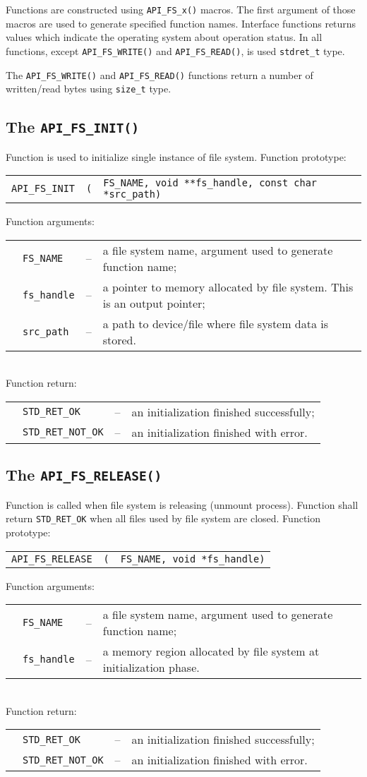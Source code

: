 \documentclass[a4paper,11pt]{report}
\makeatletter
\newcommand{\macro}[1]{\texttt{#1}}
\newcommand{\code}[1]{\texttt{#1}}
\newcommand{\type}[1]{\texttt{#1}}
\newcommand{\prototype}[2]{
   \begin{tabularx}{\textwidth}{@{}l@{}l@{}X}
      \code{#1} & \code{(} & \code{#2)}
   \end{tabularx}
}
\newcommand{\apidescription}[5]{
   #1\newline Function prototype:
   \begin{center}
      \prototype{#2}{#3}
   \end{center}
   Function arguments:\\
   \indent
   \begin{tabularx}{0.95\textwidth}{@{}lllX@{}}
      #4
   \end{tabularx}\\[1ex]
   Function return:\\
   \indent
   \begin{tabularx}{0.95\textwidth}{@{}lllX@{}}
      #5
   \end{tabularx}
}
\newcommand{\apiarg}[2]{\textbullet & \code{#1} & -- & #2\\}
\newcommand{\apiret}[2]{\textbullet & \code{#1} & -- & #2\\}
\makeatother
\begin{document}
Functions are constructed using \macro{API\_FS\_x()} macros. The first argument of those macros are
used to generate specified function names. Interface functions returns values which indicate the
operating system about operation status. In all functions, except \macro{API\_FS\_WRITE()} and
\macro{API\_FS\_READ()}, is used \type{stdret\_t} type.

The \macro{API\_FS\_WRITE()} and \macro{API\_FS\_READ()} functions return a number of written/read
bytes using \type{size\_t} type.

\subsection{The \code{API\_FS\_INIT()}}
\apidescription
{
   Function is used to initialize single instance of file system.
}
{API\_FS\_INIT}{FS\_NAME, void **fs\_handle, const char *src\_path}
{
   \apiarg{FS\_NAME}    {a file system name, argument used to generate function name;}
   \apiarg{fs\_handle}  {a pointer to memory allocated by file system. This is an output pointer;}
   \apiarg{src\_path}   {a path to device/file where file system data is stored.}
}
{
   \apiret{STD\_RET\_OK}      {an initialization finished successfully;}
   \apiret{STD\_RET\_NOT\_OK} {an initialization finished with error.}
}

\subsection{The \code{API\_FS\_RELEASE()}}
\apidescription
{
   Function is called when file system is releasing (unmount process). Function shall return
   \code{STD\_RET\_OK} when all files used by file system are closed.
}
{API\_FS\_RELEASE}{FS\_NAME, void *fs\_handle}
{
   \apiarg{FS\_NAME}    {a file system name, argument used to generate function name;}
   \apiarg{fs\_handle}  {a memory region allocated by file system at initialization phase.}
}
{
   \apiret{STD\_RET\_OK}      {an initialization finished successfully;}
   \apiret{STD\_RET\_NOT\_OK} {an initialization finished with error.}
}
\end{document}
